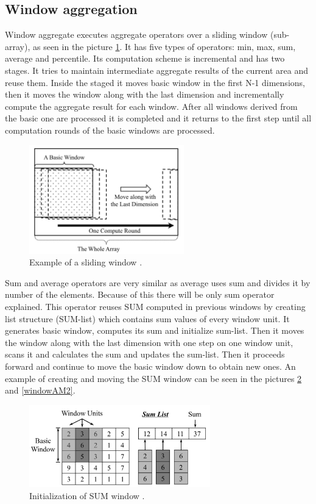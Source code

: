 \subsection{Window aggregation}
Window aggregate executes aggregate operators over a sliding window (sub-array), as seen in the picture \ref{windowAMwin}. It has five types of operators: min, max, sum, average and percentile.
Its computation scheme is incremental and has two stages. It tries to maintain intermediate aggregate results of the current area and reuse them. Inside the staged it moves basic window in the first N-1 dimensions, then it moves the window along with the last dimension and incrementally compute the aggregate result for each window. After all windows derived from the basic one are processed it is completed and it returns to the first step until all computation rounds of the basic windows are processed.

\begin{figure}
\centering
\includegraphics[width=0.6\textwidth]{windowAM.PNG}
\caption{Example of a sliding window \cite{windowAggr}. }
\label{windowAMwin}
\end{figure}

Sum and average operators are very similar as average uses sum and divides it by number of the elements. Because of this there will be only sum operator explained. This operator reuses SUM computed in previous windows by creating list structure (SUM-list) which contains sum values of every window unit. It generates basic window, computes its sum and initialize sum-list. Then it moves the window along with the last dimension with one step on one window unit, scans it and calculates the sum and updates the sum-list. Then it proceeds forward and continue to move the basic window down to obtain new ones. An example of creating and moving the SUM window can be seen in the pictures \ref{windowAM1} and \ref{windowAM2}.

\begin{figure}
\centering
\includegraphics[width=0.7\textwidth]{windowAM_sum1.PNG}
\caption{Initialization of SUM window \cite{windowAggr}.}
\label{windowAM1}
\end{figure}

